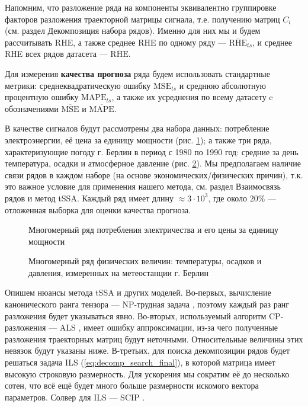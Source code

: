 			Напомним, что разложение ряда на компоненты эквивалентно группировке факторов разложения траекторной матрицы сигнала, т.е. получению матриц $ C_i $ (см. раздел Декомпозиция набора рядов). Именно для них мы и будем рассчитывать RHE, а также среднее RHE по одному ряду --- $ \overline{\text{RHE}}_{ts} $, и среднее RHE всех рядов датасета --- $ \overline{\text{RHE}} $.
			
			Для измерения \textbf{качества прогноза} ряда будем использовать стандартные метрики: среднеквадратическую ошибку $ \text{MSE}_{ts} $ и среднюю абсолютную процентную ошибку $ \text{MAPE}_{ts} $, а также их усреднения по всему датасету c обозначениями $ \overline{\text{MSE}} $ и $ \overline{\text{MAPE}} $.
			
			В качестве сигналов будут рассмотрены два набора данных: потребление электроэнергии, её цена за единицу мощности (рис. \ref{fig:electr_data}); а также три ряда, характеризующие погоду г. Берлин в период с 1980 по 1990 год: средние за день температура, осадки и атмосферное давление (рис. \ref{fig:weather_data}). Мы предполагаем наличие связи рядов в каждом наборе (на основе экономических/физических причин), т.к. это важное условие для применения нашего метода, см. раздел Взаимосвязь рядов и метод tSSA. Каждый ряд имеет длину $ \approx 3 \cdot 10^3 $, где около $ 20\% $ --- отложенная выборка для оценки качества прогноза.
			
			\begin{figure}[h]
				\centering
				\caption{Многомерный ряд потребления электричества и его цены за единицу мощности}\label{fig:electr_data}
			\end{figure}
			
			\begin{figure}[h]
				\centering
				\caption{Многомерный ряд физических величин: температуры, осадков и давления, измеренных на метеостанции г. Берлин}\label{fig:weather_data}
			\end{figure}
			
			Опишем нюансы метода tSSA и других моделей. Во-первых, вычисление канонического ранга тензора --- NP-трудная задача \cite{HASTAD1990644}, поэтому каждый раз ранг разложения будет указываться явно. Во-вторых, используемый алгоритм CP-разложения --- ALS \cite{kolda_tensors}, имеет ошибку аппроксимации, из-за чего полученные разложения траекторных матриц будут неточными. Относительные величины этих невязок будут указаны ниже. В-третьих, для поиска декомпозиции рядов будет решаться задача ILS (\ref{eq:decomp_search_final}), в которой матрица имеет высокую строковую размерность. Для ускорения мы сократим её до несколько сотен, что всё ещё будет много больше размерности искомого вектора параметров. Солвер для ILS --- SCIP \cite{BolusaniEtal2024ZR}.
			
